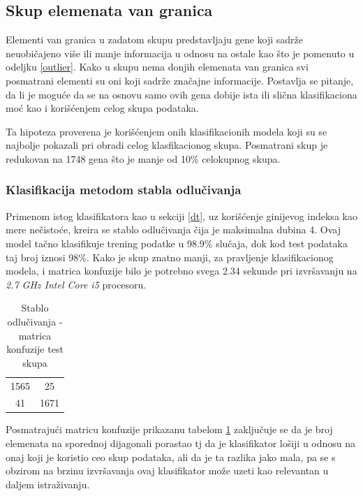 \documentclass[a4paper]{article}
\begin{document}
\subsection{Skup elemenata van granica}

Elementi van granica u zadatom skupu predstavljaju gene koji sadrže neuobičajeno više ili manje informacija u odnosu na ostale kao što je pomenuto u odeljku \ref{outlier}. Kako u skupu nema donjih elemenata van granica svi posmatrani elementi su oni koji sadrže značajne informacije. Postavlja se pitanje, da li je moguće da se na osnovu samo ovih gena dobije ista ili slična klasifikaciona moć kao i korišćenjem celog skupa podataka. 

Ta hipoteza proverena je korišćenjem onih klasifikacionih modela koji su se najbolje pokazali pri obradi celog klasfikacionog skupa. Posmatrani skup je redukovan na 1748 gena što je manje od 10\% celokupnog skupa.

\subsubsection{Klasifikacija metodom stabla odlučivanja}

Primenom istog klasifikatora kao u sekciji \ref{dt}, uz korišćenje ginijevog indeksa kao mere nečistoće, kreira se stablo odlučivanja čija je maksimalna dubina 4. Ovaj model tačno klasifikuje trening podatke u 98.9\% slučaja, dok kod test podataka taj broj iznosi 98\%. Kako je skup znatno manji, za pravljenje klasifikacionog modela, i matrica konfuzije bilo je potrebno svega 2.34 sekunde pri izvršavanju na \textit{2.7 GHz Intel Core i5} procesoru.

\begin{table}[h!]
\centering
\begin{tabular}{|c c|}
  \hline
  1565 & 25 \\
  41 & 1671  \\
 \hline
\end{tabular}
\caption{Stablo odlučivanja - matrica konfuzije test skupa}
\label{table:soo}
\end{table}
 
Posmatrajući matricu konfuzije prikazanu tabelom \ref{table:soo} zaključuje se da je broj elemenata na sporednoj dijagonali porastao tj da je klasifikator lošiji u odnosu na onaj koji je koristio ceo skup podataka, ali da je ta razlika jako mala, pa se s obzirom na brzinu izvršavanja ovaj klasifikator može uzeti kao relevantan u daljem istraživanju.
\end{document}
